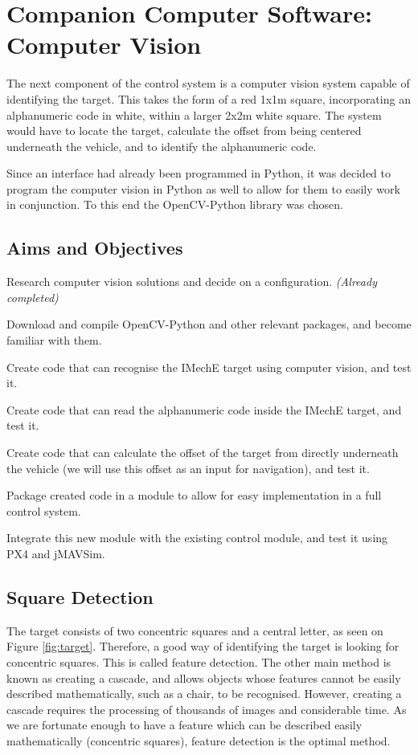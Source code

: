 \documentclass[11pt]{article}
\begin{document}
\section{Companion Computer Software: Computer Vision}
The next component of the control system is a computer vision system capable of identifying the target. This takes the form of a red 1x1m square, incorporating an alphanumeric code in white, within a larger 2x2m white square\cite{IMechE_rules}. The system would have to locate the target, calculate the offset from being centered underneath the vehicle, and to identify the alphanumeric code.

Since an interface had already been programmed in Python, it was decided to program the computer vision in Python as well to allow for them to easily work in conjunction. To this end the OpenCV-Python library was chosen.

\subsection{Aims and Objectives}
\begin{compactenum}
    \item Research computer vision solutions and decide on a configuration. \emph{(Already completed)}
    \item Download and compile OpenCV-Python and other relevant packages, and become familiar with them.
    \item Create code that can recognise the IMechE target using computer vision, and test it.
    \item Create code that can read the alphanumeric code inside the IMechE target, and test it.
    \item Create code that can calculate the offset of the target from directly underneath the vehicle (we will use this offset as an input for navigation), and test it.
    \item Package created code in a module to allow for easy implementation in a full control system.
    \item Integrate this new module with the existing control module, and test it using PX4 and jMAVSim.
\end{compactenum}

\subsection{Square Detection}
The target consists of two concentric squares and a central letter, as seen on Figure \ref{fig:target}\cite{IMechE_rules}. Therefore, a good way of identifying the target is looking for concentric squares. This is called feature detection. The other main method is known as creating a cascade, and allows objects whose features cannot be easily described mathematically, such as a chair, to be recognised. However, creating a cascade requires the processing of thousands of images and considerable time. As we are fortunate enough to have a feature which can be described easily mathematically (concentric squares), feature detection is the optimal method.
\end{document}
